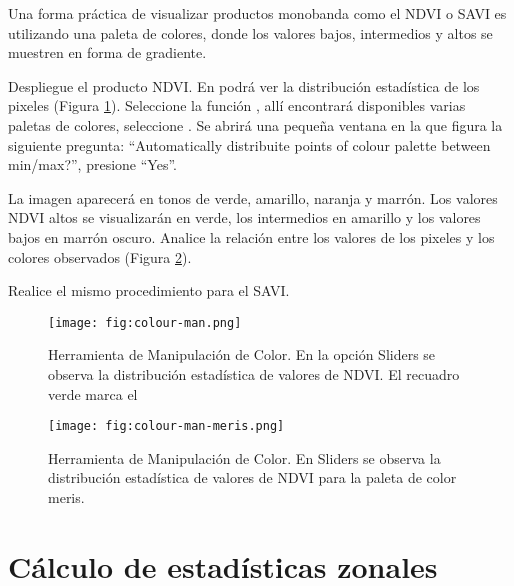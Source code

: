 Una forma práctica de visualizar productos monobanda como el NDVI o SAVI es utilizando una paleta de colores, donde los valores bajos, intermedios y altos se muestren en forma de gradiente.

Despliegue el producto NDVI. En  podrá ver la distribución estadística de los pixeles (Figura \ref{fig:color-man}). Seleccione la función , allí encontrará disponibles varias paletas de colores, seleccione . Se abrirá una pequeña ventana en la que figura la siguiente pregunta: ``Automatically distribuite points of colour palette between min/max?'', presione ``Yes''.

La imagen aparecerá en tonos de verde, amarillo, naranja y marrón. Los valores NDVI altos se visualizarán en verde, los intermedios en amarillo y los valores bajos en marrón oscuro. Analice la relación entre los valores de los pixeles y los colores observados (Figura \ref{fig:color-man-meris}).

Realice el mismo procedimiento para el SAVI.

\begin{figure}[h!]
    \centering
    \texttt{[image: fig:colour-man.png]}
    \caption{Herramienta de Manipulación de Color. En la opción Sliders se observa la distribución estadística de valores de NDVI. El recuadro verde marca el }
    \label{fig:color-man}
\end{figure}

\begin{figure}[h!]
    \centering
    \texttt{[image: fig:colour-man-meris.png]}
    \caption{Herramienta de Manipulación de Color. En Sliders se observa la distribución estadística de valores de NDVI para la paleta de color meris.}
    \label{fig:color-man-meris}
\end{figure}

\section{Cálculo de estadísticas zonales}

